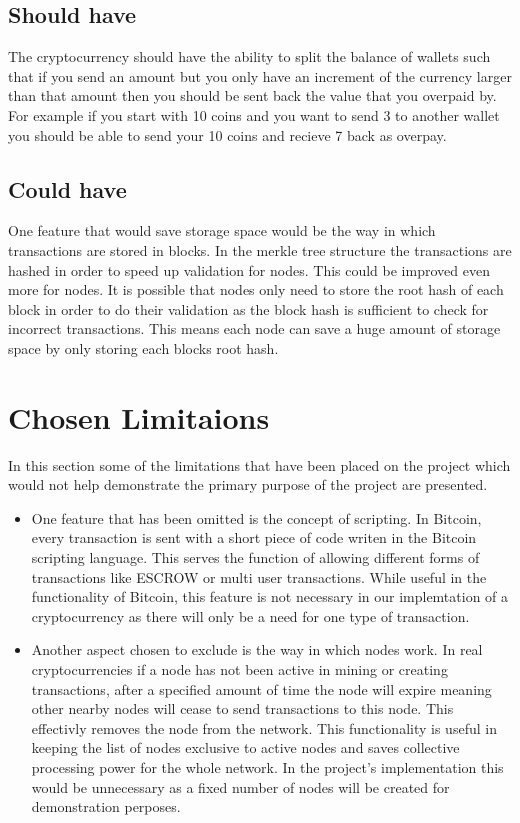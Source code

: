 \documentclass{l4proj}
\begin{document}
\subsection{Should have}
The cryptocurrency should have the ability to split the balance of wallets such that if you send an amount but you only
have an increment of the currency larger than that amount then you should be sent back the value that you overpaid by.
For example if you start with 10 coins and you want to send 3 to another wallet you should be able to send your 10 coins
and recieve 7 back as overpay.

\subsection{Could have}
One feature that would save storage space would be the way in which transactions are stored in blocks. In the merkle tree
structure the transactions are hashed in order to speed up validation for nodes. This could be improved even more for 
nodes. It is possible that nodes only need to store the root hash of each block in order to do their validation as the
block hash is sufficient to check for incorrect transactions. This means each node can save a huge amount of storage space
by only storing each blocks root hash.

\section{Chosen Limitaions}
In this section some of the limitations that have been placed on the project which would not help demonstrate the 
primary purpose of the project are presented.
\begin{itemize}
    \item One feature that has been omitted is the concept of scripting. In Bitcoin, every transaction is sent
        with a short piece of code writen in the Bitcoin scripting language. This serves the function of allowing 
        different forms of transactions like ESCROW or multi user transactions. While useful in the functionality of
        Bitcoin, this feature is not necessary in our implemtation of a cryptocurrency as there will only be a need
        for one type of transaction.
    \item Another aspect chosen to exclude is the way in which nodes work. In real cryptocurrencies if a node
        has not been active in mining or creating transactions, after a specified amount of time the node will expire
        meaning other nearby nodes will cease to send transactions to this node. This effectivly removes the node from
        the network. This functionality is useful in keeping the list of nodes exclusive to active nodes and saves
        collective processing power for the whole network. In the project's implementation this would be unnecessary as a fixed
        number of nodes will be created for demonstration perposes.
\end{itemize}
\end{document}
